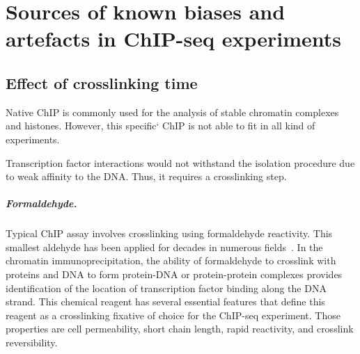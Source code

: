 \chapter{Sources of known biases and artefacts in ChIP-seq experiments}



\section{Effect of crosslinking time}
\label{formaldehyde}


Native ChIP is commonly used for the analysis of stable chromatin complexes~\cite{kasinathan2014high} and histones.
However, this specific` ChIP is not able to fit in all kind of experiments.

Transcription factor interactions would not withstand the isolation procedure due to weak affinity to the DNA.
Thus, it requires a crosslinking step.
\paragraph{Formaldehyde.}
Typical ChIP assay involves crosslinking using formaldehyde reactivity. 
This smallest aldehyde has been applied for decades in numerous fields~\cite{eckels2003formalin,werner2000effect,gavrilov2015vivo}.
In the chromatin immunoprecipitation, the ability of formaldehyde to crosslink with proteins and DNA to form protein-DNA or protein-protein complexes provides identification of the location of transcription factor binding along the DNA strand.
This chemical reagent has several essential features that define this reagent as a crosslinking fixative of choice for the ChIP-seq experiment. 
Those properties are cell permeability, short chain length, rapid reactivity, and crosslink reversibility.

